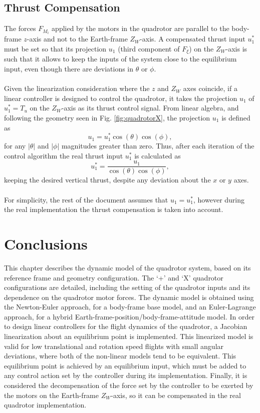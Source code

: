 \subsection{Thrust Compensation}
The forces $F_{M_i}$ applied by the motors in the quadrotor are parallel to the body-frame $z$-axis and not to the Earth-frame $Z_W$-axis. A compensated thrust input $u_{1}^{*}$ must be set so that its projection $u_1$ (third component of $F_\xi$) on the $Z_W$-axis is such that it allows to keep the inputs of the system close to the equilibrium input, even though there are deviations in $\theta$ or $\phi$.
\\\\
Given the linearization consideration where the $z$ and $Z_W$ axes coincide, if a linear controller is designed to control the quadrotor, it takes the projection $u_{1}$ of $u_{1}^{*} = T_{u}$ on the $Z_W$-axis as its thrust control signal. From linear algebra, and following the geometry seen in Fig. \ref{fig:quadrotorX}, the projection $u_{1}$ is defined as
\begin{equation}
u_{1} = u_{1}^{*}\cos(\theta)\cos(\phi),
\end{equation}
for any $|\theta|$ and $|\phi|$ magnitudes greater than zero. Thus, after each iteration of the control algorithm the real thrust input $u_{1}^{*}$ is calculated as
\begin{equation}
u_{1}^{*} = \dfrac{u_{1}}{\cos(\theta)\cos(\phi)},
\end{equation}
keeping the desired vertical thrust, despite any deviation about the $x$ or $y$ axes. 
\\\\For simplicity, the rest of the document assumes that $u_1 = u_{1}^{*}$, however during the real implementation the thrust compensation is taken into account.
\section{Conclusions}
This chapter describes the dynamic model of the quadrotor system, based on its reference frame and geometry configuration. The `+' and `X' quadrotor configurations are detailed, including the setting of the quadrotor inputs and its dependence on the quadrotor motor forces. The dynamic model is obtained using the Newton-Euler approach, for a body-frame base model, and an Euler-Lagrange approach, for a hybrid Earth-frame-position/body-frame-attitude model. In order to design linear controllers for the flight dynamics of the quadrotor, a Jacobian linearization about an equilibrium point is implemented. This linearized model is valid for low translational and rotation speed flights with small angular deviations, where both of the non-linear models tend to be equivalent. This equilibrium point is achieved by an equilibrium input, which must be added to any control action set by the controller during its implementation.  Finally, it is considered the decompensation of the force set by the controller to be exerted by the motors on the Earth-frame $Z_W$-axis, so it can be compensated in the real quadrotor implementation.
